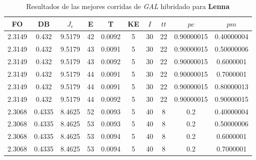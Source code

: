 \begin{table}[h!]
    \footnotesize
    \begin{center}
        \begin{tabular}{|c|c|c|c|c|c|c|c|c|c|}
        \hline
            {\bf FO} & {\bf DB} & $J_e$ & {\bf E} & {\bf T} & {\bf KE} & $I$ & $tt$ & $pc$ & $pm$ \\
        \hline
        \hline
            2.3149 & 0.432  & 9.5179 & 42 & 0.0092 & 5 & 30 & 22 & 0.90000015 & 0.40000004\\
        \hline
        \hline
            2.3149 & 0.432  & 9.5179 & 43 & 0.0091 & 5 & 30 & 22 & 0.90000015 & 0.50000006\\
        \hline
        \hline
            2.3149 & 0.432  & 9.5179 & 43 & 0.0092 & 5 & 30 & 22 & 0.90000015 & 0.6000001\\
        \hline
        \hline
            2.3149 & 0.432  & 9.5179 & 44 & 0.0091 & 5 & 30 & 22 & 0.90000015 & 0.7000001\\
        \hline
        \hline
            2.3149 & 0.432  & 9.5179 & 44 & 0.0091 & 5 & 30 & 22 & 0.90000015 & 0.80000013\\
        \hline
        \hline
            2.3149 & 0.432  & 9.5179 & 44 & 0.0092 & 5 & 30 & 22 & 0.90000015 & 0.90000015\\
        \hline
        \hline
            2.3068 & 0.4335  & 8.4625 & 52 & 0.0093 & 5 & 40 & 8 & 0.2 & 0.40000004\\
        \hline
        \hline
            2.3068 & 0.4335  & 8.4625 & 53 & 0.0093 & 5 & 40 & 8 & 0.2 & 0.50000006\\
        \hline
        \hline
            2.3068 & 0.4335  & 8.4625 & 53 & 0.0094 & 5 & 40 & 8 & 0.2 & 0.6000001\\
        \hline
        \hline
            2.3068 & 0.4335  & 8.4625 & 53 & 0.0094 & 5 & 40 & 8 & 0.2 & 0.7000001\\
        \hline
        \end{tabular}
        \caption{Resultados de las mejores corridas de \emph{GAL} hibridado para {\bf Lenna}}
        \label{tb:tableGAL45}
    \end{center}
\end{table}
